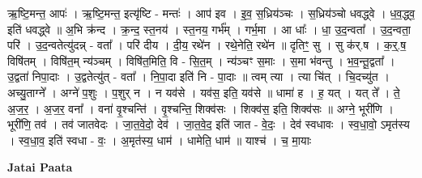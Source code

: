 \documentclass[17pt]{extarticle}
\begin{document}
ऋ॒ष्टि॒मन्त॒ आपः॑ । ऋ॒ष्टि॒मन्त॒ इत्यृ॑ष्टि - मन्तः॑ । आप॑ इव । इ॒व॒ स॒ध्रिय॑ञ्चः । स॒ध्रिय॑ञ्चो धवद्ध्वे । ध॒व॒द्ध्व॒ इति॑ धवद्ध्वे ॥ अ॒भि क्र॑न्द । क्र॒न्द॒ स्त॒नय॑ । स्त॒नय॒ गर्भ᳚म् । गर्भ॒मा । आ धाः᳚ । धा॒ उ॒द॒न्वता᳚ । उ॒द॒न्वता॒ परि॑ । उ॒द॒न्वतेत्यु॑दन्न् - वता᳚ । परि॑ दीय । दी॒य॒ रथे॑न । रथे॒नेति॒ रथे॑न ॥ दृतिꣳ॒॒ सु । सु क॑र्.ष । क॒र्॒.ष॒ विषि॑तम् । विषि॑त॒म् न्य॑ञ्चम् । विषि॑त॒मिति॒ वि - सि॒त॒म् । न्य॑ञ्चꣳ स॒माः । स॒मा भ॑वन्तु । भ॒व॒न्तू॒द्वता᳚ । उ॒द्वता॑ निपा॒दाः । उ॒द्वतेत्यु॑त् - वता᳚ । नि॒पा॒दा इति॑ नि - पा॒दाः ॥ त्वम् त्या । त्या चि॑त् । चि॒दच्यु॑त । अच्यु॒ताग्ने᳚ । अग्ने॑ प॒शुः । प॒शुर् न । न यव॑से । यव॑स॒ इति॒ यव॑से ॥ धामा॑ ह । ह॒ यत् । यत् ते᳚ । ते॒ अ॒ज॒र॒ । अ॒ज॒र॒ वना᳚ । वना॑ वृ॒श्चन्ति॑ । वृ॒श्चन्ति॒ शिक्व॑सः । शिक्व॑स॒ इति॒ शिक्व॑सः ॥ अग्ने॒ भूरी॑णि । भूरी॑णि॒ तव॑ । तव॑ जातवेदः । जा॒त॒वे॒दो॒ देव॑ । जा॒त॒वे॒द॒ इति॑ जात - वे॒दः॒ । देव॑ स्वधावः । स्व॒धा॒वो॒ ऽमृत॑स्य । स्व॒धा॒व॒ इति॑ स्वधा - वः॒ । अ॒मृत॑स्य॒ धाम॑ । धामेति॒ धाम॑ ॥ याश्च॑ । च॒ मा॒याः \newline

\textbf{Jatai Paata} \newline
\end{document}
